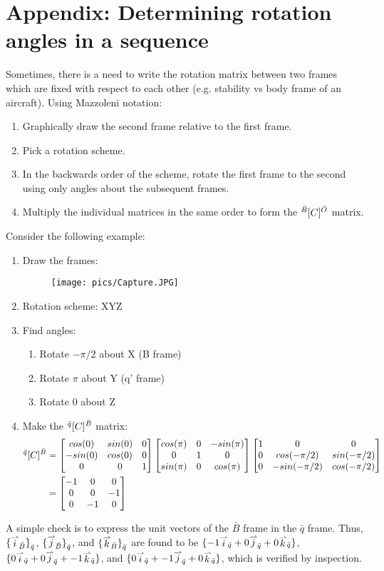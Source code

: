 \documentclass{article}
\begin{document}
\newpage
\section*{Appendix: Determining rotation angles in a sequence}
Sometimes, there is a need to write the rotation matrix between two frames which are fixed with respect to each other (e.g. stability vs body frame of an aircraft). Using Mazzoleni notation:
\begin{enumerate}
    \item Graphically draw the second frame relative to the first frame.
    \item Pick a rotation scheme. 
    \item In the backwards order of the scheme, rotate the first frame to the second using only angles about the subsequent frames. 
    \item Multiply the individual matrices in the same order to form the $ {}^{\bar{B}}\lbrack{C}\rbrack^{\bar{O}}$ matrix. 
\end{enumerate}
% 
Consider the following example:
\begin{enumerate}
    \item Draw the frames:
    \begin{figure}[h]
        \centering
        \texttt{[image: pics/Capture.JPG]}
        \label{fig:ex1}
    \end{figure}
    \item Rotation scheme: XYZ
    \item Find angles:
    \begin{enumerate}
        \item Rotate $-\pi/2$ about X (B frame)
        \item Rotate $\pi$ about Y (q' frame)
        \item Rotate $0$ about Z
    \end{enumerate}
    \item Make the $ {}^{\bar{q}}\lbrack{C}\rbrack^{\bar{B}}$ matrix:
    \begin{equation}
        \begin{split}
             {}^{\bar{q}}\lbrack{C}\rbrack^{\bar{B}} & = \begin{bmatrix} cos(0) & sin(0) & 0 \\ -sin(0) & cos(0) & 0 \\ 0 & 0 & 1 \end{bmatrix}  \begin{bmatrix} cos(\pi) & 0 & -sin(\pi) \\ 0 & 1 & 0 \\ sin(\pi) & 0& cos(\pi) \end{bmatrix}  \begin{bmatrix} 1 & 0 & 0 \\ 0 & cos(-\pi/2) & sin(-\pi/2) \\ 0 & -sin(-\pi/2) & cos(-\pi/2) \end{bmatrix}  \\
            & =  \begin{bmatrix} -1 & 0 & 0 \\ 0 & 0 & -1 \\ 0 & -1 & 0 \end{bmatrix} 
        \end{split}
    \end{equation}
\end{enumerate}
% 
A simple check is to express the unit vectors of the $\bar{B}$ frame in the $\bar{q}$ frame. Thus, $\Frame{\UnitVec{i}{B}}{q}$, $\Frame{\UnitVec{j}{B}}{q}$, and $\Frame{\UnitVec{k}{B}}{q}$ are found to be $\VecExpressH{q}{-1}{0}{0}$, $\VecExpressH{q}{0}{0}{-1}$, and  $\VecExpressH{q}{0}{-1}{0}$, which is verified by inspection. 
\end{document}

